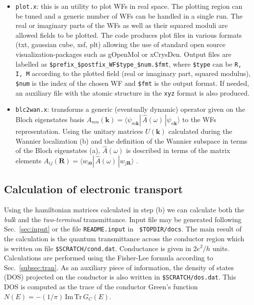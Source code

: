 \begin{itemize}
\item {\tt plot.x}: this is an utility to plot WFs in real space.
      The plotting region can be tuned and a generic number of WFs can be
      handled in a single run.
      The real or imaginary parts of the WFs as well as their squared moduli are
      allowed fields to be plotted.
      The code produces plot files in various formats (txt, gaussian cube, xsf, plt)
      allowing the use of standard open source visualization-packages
      such as gOpenMol or xCrysDen. Output files are labelled as
      {\tt \$prefix\_\$postfix\_WF\$type\_\$num.\$fmt}, where {\tt \$type} can be
      {\tt R, I, M} according to the plotted field (real or imaginary part, squared
      modulus), {\tt \$num} is the index of the chosen WF and {\tt \$fmt} is the
      output format. If needed, an auxiliary file with the atomic structure
      in the {\tt xyz} format is also produced.
\item {\tt blc2wan.x}: transforms a generic (eventually dynamic) operator
      given on the Bloch eigenstates basis $A_{mn}(\mathbf{k}) =
      \langle \psi_{m\mathbf{k}} |\, \widehat{A}(\omega) \,|
      \psi_{n\mathbf{k}} \rangle$ to the WFs representation.
      Using the unitary matrices $U(\mathbf{k})$ calculated during the Wannier localization
      (b) and the definition of the Wannier subspace in terms of the Bloch eigenstates
      (a), $\widehat{A}(\omega)$ is described in terms of the matrix elements
      $A_{ij}(\mathbf{R}) = \langle w_{i\mathbf{0}} |\, \widehat{A}(\omega) \,|
      w_{j\mathbf{R}} \rangle$ .
\end{itemize}


\subsection {Calculation of electronic transport}
\label{subsection:transport}

Using the hamiltonian matrices calculated in step (b) we can
calculate both the {\em bulk} and the {\em two-terminal}
transmittance. Input file may be generated following
Sec.~\ref{sec:input} or the file {\tt README.input} in {\tt
\$TOPDIR/docs}. The main result of the calculation is the quantum
transmittance across the conductor region which is written on file
{\tt \$SCRATCH/cond.dat}. Conductance is given in $2e^2/h$ units.
Calculations are performed using the Fisher-Lee formula according
to Sec.~\ref{subsec:tran}. As an auxiliary piece of information,
the density of states (DOS) projected on the conductor is also
written in {\tt \$SCRATCH/dos.dat}. This DOS is computed as the
trace of the conductor Green's function $ N(E) = -(1/\pi)\,
\text{Im} \, \text{Tr}\, G_C(E)$.

